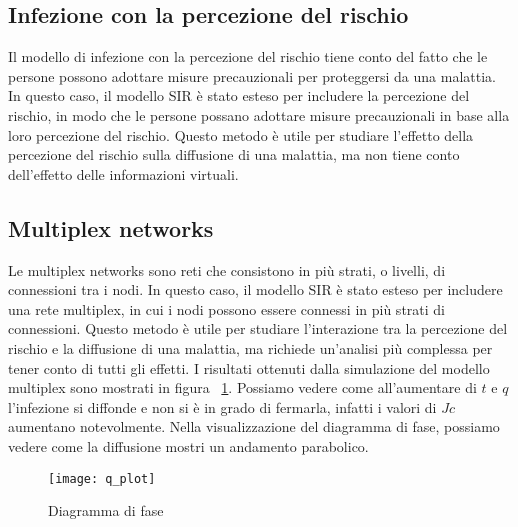 \subsection{Infezione con la percezione del rischio}\label{subsec:res-infezione-con-la-percezione-del-rischio}
    Il modello di infezione con la percezione del rischio tiene conto del fatto che le persone possono adottare misure
    precauzionali per proteggersi da una malattia.
    In questo caso, il modello SIR è stato esteso per includere la percezione del rischio, in modo che le persone possano
    adottare misure precauzionali in base alla loro percezione del rischio.
    Questo metodo è utile per studiare l'effetto della percezione del rischio sulla diffusione di una malattia, ma non
    tiene conto dell'effetto delle informazioni virtuali.

\subsection{Multiplex networks}\label{subsec:res-multiplex-networks}
    Le multiplex networks sono reti che consistono in più strati, o livelli, di connessioni tra i nodi.
    In questo caso, il modello SIR è stato esteso per includere una rete multiplex, in cui i nodi possono essere connessi
    in più strati di connessioni.
    Questo metodo è utile per studiare l'interazione tra la percezione del rischio e la diffusione di una malattia, ma
    richiede un'analisi più complessa per tener conto di tutti gli effetti.
    I risultati ottenuti dalla simulazione del modello multiplex sono mostrati in figura ~\ref{fig:diagram_phase}.
    Possiamo vedere come all'aumentare di $t$ e $q$ l'infezione si diffonde e non si è in grado di fermarla, infatti i
    valori di $Jc$ aumentano notevolmente.
    Nella visualizzazione del diagramma di fase, possiamo vedere come la diffusione mostri un andamento parabolico.

    \begin{figure}[h]
        \texttt{[image: q\_plot]}\label{fig:diagram_phase}
        \caption{Diagramma di fase}
    \end{figure}
